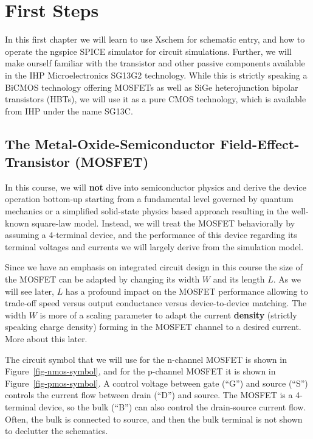 \documentclass[
  a4paper,
  DIV=11,
  numbers=noendperiod]{scrartcl}
\begin{document}
\section{First Steps}\label{sec-first-steps}

In this first chapter we will learn to use Xschem for schematic entry,
and how to operate the ngspice SPICE simulator for circuit simulations.
Further, we will make ourself familiar with the transistor and other
passive components available in the IHP Microelectronics SG13G2
technology. While this is strictly speaking a BiCMOS technology offering
MOSFETs as well as SiGe heterojunction bipolar transistors (HBTs), we
will use it as a pure CMOS technology, which is available from IHP under
the name SG13C.

\subsection{The Metal-Oxide-Semiconductor Field-Effect-Transistor
(MOSFET)}\label{sec-mosfet}

In this course, we will \textbf{not} dive into semiconductor physics and
derive the device operation bottom-up starting from a fundamental level
governed by quantum mechanics or a simplified solid-state physics based
approach resulting in the well-known square-law model. Instead, we will
treat the MOSFET behaviorally by assuming a 4-terminal device, and the
performance of this device regarding its terminal voltages and currents
we will largely derive from the simulation model.

Since we have an emphasis on integrated circuit design in this course
the size of the MOSFET can be adapted by changing its width \(W\) and
its length \(L\). As we will see later, \(L\) has a profound impact on
the MOSFET performance allowing to trade-off speed versus output
conductance versus device-to-device matching. The width \(W\) is more of
a scaling parameter to adapt the current \textbf{density} (strictly
speaking charge density) forming in the MOSFET channel to a desired
current. More about this later.

The circuit symbol that we will use for the n-channel MOSFET is shown in
Figure~\ref{fig-nmos-symbol}, and for the p-channel MOSFET it is shown
in Figure~\ref{fig-pmos-symbol}. A control voltage between gate (``G'')
and source (``S'') controls the current flow between drain (``D'') and
source. The MOSFET is a 4-terminal device, so the bulk (``B'') can also
control the drain-source current flow. Often, the bulk is connected to
source, and then the bulk terminal is not shown to declutter the
schematics.
\end{document}
